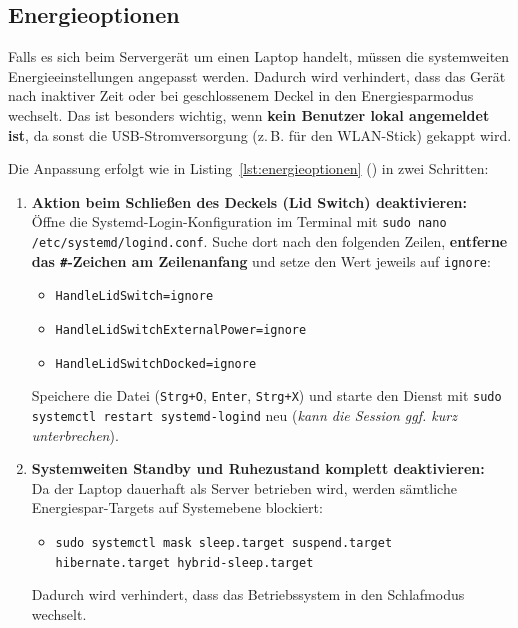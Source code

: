 \subsection{Energieoptionen}

Falls es sich beim Servergerät um einen Laptop handelt, müssen die systemweiten Energieeinstellungen angepasst werden. Dadurch wird verhindert, dass das Gerät nach inaktiver Zeit oder bei geschlossenem Deckel in den Energiesparmodus wechselt. Das ist besonders wichtig, wenn \textbf{kein Benutzer lokal angemeldet ist}, da sonst die USB-Stromversorgung (z.\,B. für den WLAN-Stick) gekappt wird.

\label{lst:energieoptionen}

Die Anpassung erfolgt wie in Listing~\ref{lst:energieoptionen} () in zwei Schritten:

\begin{enumerate}
    \item \textbf{Aktion beim Schließen des Deckels (Lid Switch) deaktivieren:}\\
    Öffne die Systemd-Login-Konfiguration im Terminal mit \texttt{sudo nano /etc/systemd/logind.conf}. Suche dort nach den folgenden Zeilen, \textbf{entferne das \texttt{\#}-Zeichen am Zeilenanfang} und setze den Wert jeweils auf \texttt{ignore}:
    \begin{itemize}
        \item \texttt{HandleLidSwitch=ignore}
        \item \texttt{HandleLidSwitchExternalPower=ignore}
        \item \texttt{HandleLidSwitchDocked=ignore}
    \end{itemize}
    Speichere die Datei (\texttt{Strg+O}, \texttt{Enter}, \texttt{Strg+X}) und starte den Dienst mit \texttt{sudo systemctl restart systemd-logind} neu (\textit{kann die Session ggf. kurz unterbrechen}).

    \item \textbf{Systemweiten Standby und Ruhezustand komplett deaktivieren:}\\
    Da der Laptop dauerhaft als Server betrieben wird, werden sämtliche Energiespar-Targets auf Systemebene blockiert:
    \begin{itemize}
        \item \texttt{sudo systemctl mask sleep.target suspend.target hibernate.target hybrid-sleep.target}
    \end{itemize}
    Dadurch wird verhindert, dass das Betriebssystem in den Schlafmodus wechselt.
\end{enumerate}

